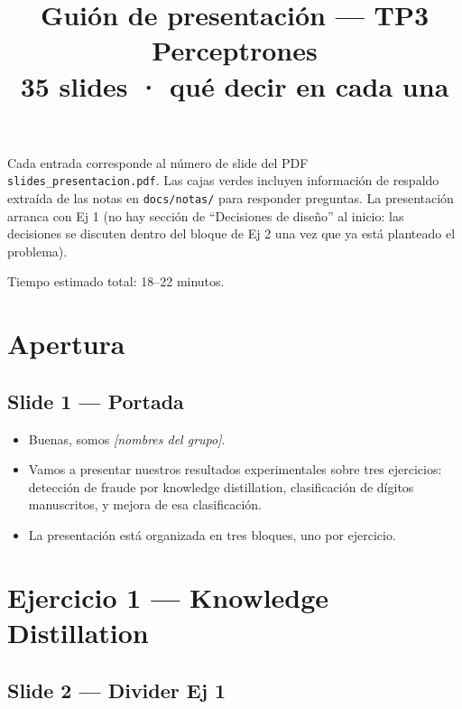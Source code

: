 \documentclass[11pt,a4paper]{article}
\title{\textbf{Guión de presentación — TP3 Perceptrones}\\
       \large 35 slides · qué decir en cada una}
\author{}
\date{}
\begin{document}
\maketitle

\noindent\textcolor{muted}{\small Cada entrada corresponde al número de slide del PDF
\texttt{slides\_presentacion.pdf}. Las cajas verdes incluyen información de respaldo
extraída de las notas en \texttt{docs/notas/} para responder preguntas. La presentación
arranca con Ej 1 (no hay sección de ``Decisiones de diseño'' al inicio: las decisiones
se discuten dentro del bloque de Ej 2 una vez que ya está planteado el problema).}

\tableofcontents
\vspace{0.5em}
\noindent\textcolor{muted}{\small Tiempo estimado total: 18--22 minutos.}

\section{Apertura}

\subsection{Slide 1 — Portada}

\begin{decir}
\begin{itemize}[leftmargin=*,topsep=0pt]
  \item Buenas, somos \emph{[nombres del grupo]}.
  \item Vamos a presentar nuestros resultados experimentales sobre tres ejercicios:
        detección de fraude por knowledge distillation, clasificación de dígitos
        manuscritos, y mejora de esa clasificación.
  \item La presentación está organizada en tres bloques, uno por ejercicio.
\end{itemize}
\end{decir}

\section{Ejercicio 1 — Knowledge Distillation}

\subsection{Slide 2 — Divider Ej 1}
\end{document}

